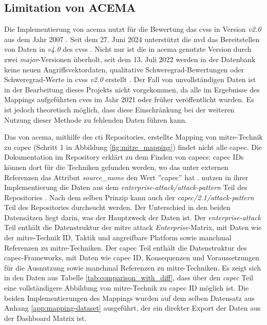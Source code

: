 \subsection{Limitation von ACEMA}
\label{limitationen-acema}
Die Implementierung von \gls{acema} nutzt für die Bewertung das \gls{cvss} in Version \textit{v2.0} aus dem Jahr 2007 \autocite[Zeile 75 - 80]{Acema_oranOCloud_Data_GatheringpyMaster}. Seit dem 27. Juni 2024 unterstützt die \gls{nvd} das Bereitstellen von Daten in \textit{v4.0} des \gls{cvss} \autocite{NVDCVSSV40}. Nicht nur ist die in \gls{acema} genutzte Version durch zwei \textit{major}-Versionen überholt, seit dem 13. Juli 2022 werden in der Datenbank keine neuen Angriffsvektordaten, qualitative Schweregrad-Bewertungen oder Schweregrad-Werte in \gls{cvss} \textit{v2.0} erstellt \autocite{RetirementCVSSV2}. Der Fall von unvollständigen Daten ist in der Bearbeitung dieses Projekts nicht vorgekommen, da alle im Ergebnisse des Mappings aufgeführten \glspl{cve} im Jahr 2021 oder früher veröffentlicht wurden. Es ist jedoch theoretisch möglich, dass diese Einschränkung bei der weiteren Nutzung dieser Methode zu fehlenden Daten führen kann.
%
\par Das von \gls{acema}, mithilfe des \gls{cti} Repositories, erstellte Mapping von \gls{mitre}-Technik zu \gls{capec} (Schritt 1 in Abbildung \ref{fig:mitre_mapping}) findet nicht alle \gls{capec}. Die Dokumentation im Repository erklärt zu dem Finden von \glspl{capec}: \gls{capec} IDs können dort für die Techniken gefunden werden, wo das unter externen Referenzen das Attribut \textit{source\_name} den Wert ''capec'' hat \autocite{CtiUSAGEmdMaster} \autocite{CtiUSAGECAPECmdMaster}. \citeauthor{klementSecuring6GTransition2024} nutzen in ihrer Implementierung die Daten aus dem \textit{enterprise-attack/attack-pattern} Teil des Repositories \autocite{FklementAcema_oranCode}. Nach dem selben Prinzip kann auch der \textit{capec/2.1/attack-pattern} Teil des Repositories durchsucht werden. Der Unterschied in den beiden Datensätzen liegt darin, was der Hauptzweck der Daten ist. Der \textit{enterprise-attack} Teil enthält die Datenstruktur  der \gls{mitre} \gls{attack} \textit{Enterprise}-Matrix, mit Daten wie der \gls{mitre}-Technik ID, Taktik und angreifbare Platform sowie manchmal Referenzen zu \gls{mitre}-Techniken. Der \gls{capec} Teil enthält die Datenstruktur  des \gls{capec}-Frameworks, mit Daten wie \gls{capec} ID, Konsequenzen und Voraussetzungen für die Ausnutzung sowie manchmal Referenzen zu \gls{mitre}-Techniken. Es zeigt sich in den Daten aus Tabelle \ref{tab:comparison_with_diff}, dass über den \textit{\gls{capec}} Teil eine vollständigere Abbildung von \gls{mitre}-Technik zu \gls{capec} ID möglich ist. Die beiden Implementierungen des Mappings wurden auf dem selben Datensatz aus Anhang \ref{app:mapping-dataset} ausgeführt, der ein direkter Export der Daten aus der Dashboard Matrix ist. 
%


